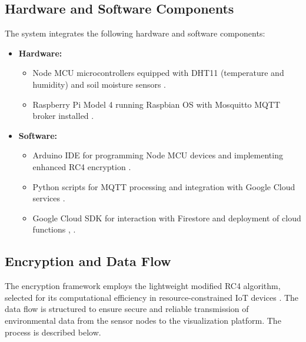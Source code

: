 \documentclass[runningheads]{llncs}
\begin{document}
\subsection{Hardware and Software Components}

The system integrates the following hardware and software components:

\begin{itemize}
    \item \textbf{Hardware:}
    \begin{itemize}
        \item Node MCU microcontrollers equipped with DHT11 (temperature and humidity) and soil moisture sensors \cite{ref10}.
        \item Raspberry Pi Model 4 running Raspbian OS with Mosquitto MQTT broker installed \cite{ref17}.
    \end{itemize}
    \item \textbf{Software:}
    \begin{itemize}
        \item Arduino IDE for programming Node MCU devices and implementing enhanced RC4 encryption \cite{ref10}.
        \item Python scripts for MQTT processing and integration with Google Cloud services \cite{ref22}.
        \item Google Cloud SDK for interaction with Firestore and deployment of cloud functions \cite{ref19}, \cite{ref22}.
    \end{itemize}
\end{itemize}

\subsection{Encryption and Data Flow}

The encryption framework employs the lightweight modified RC4 algorithm, selected for its computational efficiency in resource-constrained IoT devices \cite{ref10}. The data flow is structured to ensure secure and reliable transmission of environmental data from the sensor nodes to the visualization platform. The process is described below.
\end{document}
